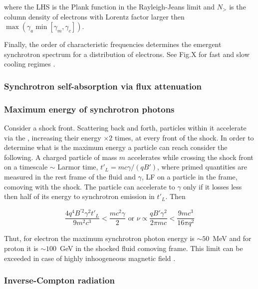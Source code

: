where the LHS is the Plank function in the Rayleigh-Jeans limit and $N_{>}$ is the column density of electrons with Lorentz factor larger then $\max(\gamma_a\min[\gamma_m,\gamma_c])$.

Finally, the order of characteristic frequencies determines the emergent synchrotron spectrum for a distribution of electrons. 
See Fig.X for fast and slow cooling regimes \citet{Sari:1997qe}.


\subsubsection{Synchrotron self-absorption via flux attenuation}



\subsubsection{Maximum energy of synchrotron photons}

Consider a shock front. Scattering back and forth, particles within it accelerate via the , increasing their energy $\times 2$ times, at every front of the shock.
In order to determine what is the maximum energy a particle can reach consider the following. A charged particle of mass $m$ accelerates while crossing the shock front on a timescale $\sim$ Larmor time, $t'_L = mc\gamma/(qB')$, where primed quantities are measured in the rest frame of the fluid and $\gamma$, \ac{LF} on a particle in the frame, comoving with the shock. 
The particle can accelerate to $\gamma$ only if it losses less then half of its energy to synchrotron emission in $t'_L$. Then 

\begin{equation}
\frac{4 q^4 B^{'2}\gamma^2 t'_L}{9 m^2 c^3} < \frac{m c^2\gamma}{2} \text{ or } \nu\propto \frac{q B' \gamma^2}{2\pi m c} < \frac{9 m c^3}{16\pi q^2}
\end{equation}

Thut, for electron the maximum synchrotron photon energy is $\sim 50$~MeV and for proton it is $\sim 100$~GeV in the shocked fluid comoving frame. 
This limit can be exceeded in case of highly inhoogeneous magnetic field \citep{Kumar:2012}.


\subsubsection{Inverse-Compton radiation}

